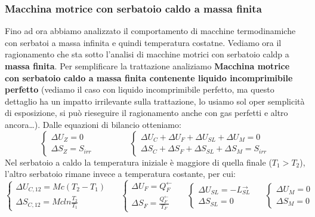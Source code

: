 \subsubsection{Macchina motrice con serbatoio caldo a massa finita}
Fino ad ora abbiamo analizzato il comportamento di macchine termodinamiche con serbatoi a massa infinita e quindi temperatura costatne. Vediamo ora il ragionamento che sta sotto l'analisi di macchine motrici con serbatoio caldp a \textbf{massa finita}.\newline
\newline
Per semplificare la trattazione analiziamo \textbf{Macchina motrice con serbatoio caldo a massa finita contenente liquido incomprimibile perfetto} (vediamo il caso con liquido incomprimibile perfetto, ma questo dettaglio ha un impatto irrilevante sulla trattazione, lo usiamo sol oper semplicità di esposizione, si può rieseguire il ragionamento anche con gas perfetti e altro ancora\dots).\newline
\newline
Dalle equazioni di bilancio otteniamo:
\[
    \begin{cases}
        \Delta U_Z = 0\\ \Delta S_Z = S_{irr}
    \end{cases} \;\;\;\;\;\;\;\;\;\;\;\;\;\;\; \begin{cases}
        \Delta U_C + \Delta U_F + \Delta U_{SL} + \Delta U_M = 0 \\
        \Delta S_C + \Delta S_F + \Delta S_{SL} + \Delta S_M = S_{irr}
    \end{cases}
\]
Nel serbatoio a caldo la temperatura iniziale è maggiore di quella finale ($T_1 > T_2$), l'altro serbatoio rimane invece a temperatura costante, per cui:
\[ 
    \begin{cases}
        \Delta U_{C,12} = Mc(T_2 -T_1)\\ \Delta S_{C,12} = Mcln \frac{T_2}{T_1}
    \end{cases}\;\;\;\;\; \begin{cases}
        \Delta U_F = Q_F^\leftarrow \\ \Delta S_F = \frac{Q_F^\leftarrow}{T_F}
    \end{cases} \;\;\;\;\; \begin{cases}
        \Delta U_{SL} = - L_{SL}^\rightarrow \\ \Delta S_{SL} = 0
    \end{cases} \;\;\;\;\; \begin{cases}
        \Delta U_M = 0\\ \Delta S_M = 0
    \end{cases}
\]
